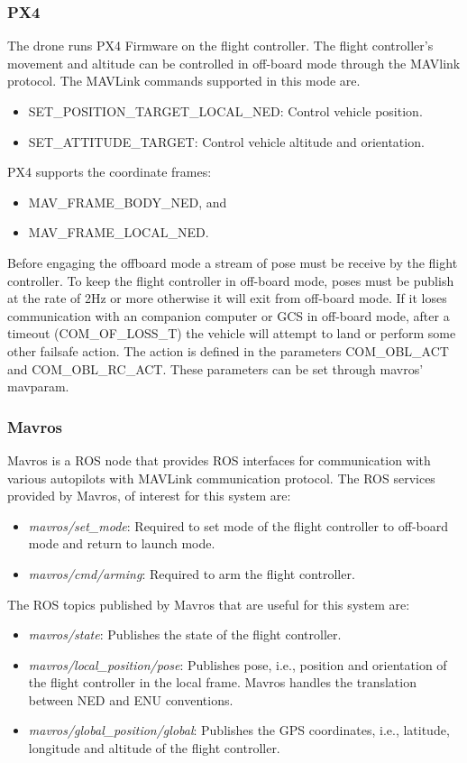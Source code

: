 \subsubsection{PX4}
The drone runs PX4 Firmware on the flight controller. The flight controller's movement and altitude can be controlled in off-board mode through the MAVlink protocol. The MAVLink commands supported in this mode are.

\begin{itemize}
	\item SET\_POSITION\_TARGET\_LOCAL\_NED: Control vehicle position.
	\item SET\_ATTITUDE\_TARGET: Control vehicle altitude and orientation.
\end{itemize}

PX4 supports the coordinate frames: 
\begin{itemize}
	\item MAV\_FRAME\_BODY\_NED, and
	\item MAV\_FRAME\_LOCAL\_NED.
\end{itemize} 

Before engaging the offboard mode a stream of pose must be receive by the flight controller. To keep the flight controller in off-board mode, poses must be publish at the rate of 2Hz or more otherwise it will exit from off-board mode. If it loses communication with an companion computer or GCS in off-board mode, after a timeout (COM\_OF\_LOSS\_T) the vehicle will attempt to land or perform some other failsafe action. The action is defined in the parameters COM\_OBL\_ACT and COM\_OBL\_RC\_ACT. These parameters can be set through mavros' mavparam.

\subsubsection{Mavros}

Mavros is a ROS node that provides ROS interfaces for communication with various autopilots with MAVLink communication protocol.
The ROS services provided by Mavros,  of interest for this system are:
\begin{itemize}
	\item \textit{mavros/set\_mode}: Required to set mode of the flight controller to off-board mode and return to launch mode.
	\item \textit{mavros/cmd/arming}: Required to arm the flight controller.
\end{itemize}

The ROS topics published by Mavros that are useful for this system are:
\begin{itemize}
	\item \textit{mavros/state}: Publishes the state of the flight controller.
	\item \textit{mavros/local\_position/pose}: Publishes pose, i.e., position and orientation of the flight controller in the local frame. Mavros handles the translation between NED and ENU conventions.
	\item \textit{mavros/global\_position/global}: Publishes the GPS coordinates, i.e., latitude, longitude and altitude of the flight controller.
\end{itemize}

